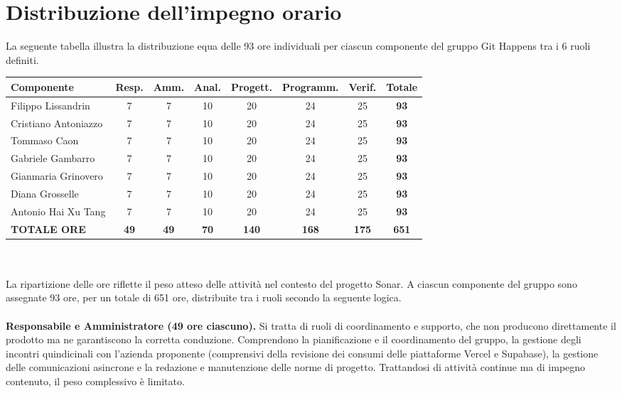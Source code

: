 \section{Distribuzione dell'impegno orario}
La seguente tabella illustra la distribuzione equa delle 93 ore individuali per ciascun componente del gruppo Git Happens tra i 6 ruoli definiti.

\vspace{2mm}
\noindent
\begin{tabularx}{\textwidth}{|X c c c c c c | c|}
\hline
\textbf{Componente} & \textbf{Resp.} & \textbf{Amm.} & \textbf{Anal.} & \textbf{Progett.} & \textbf{Programm.} & \textbf{Verif.} & \textbf{Totale} \\
\hline
Filippo Lissandrin & 7 & 7 & 10 & 20 & 24 & 25 & \textbf{93} \\
Cristiano Antoniazzo & 7 & 7 & 10 & 20 & 24 & 25 & \textbf{93} \\
Tommaso Caon & 7 & 7 & 10 & 20 & 24 & 25 & \textbf{93} \\
Gabriele Gambarro & 7 & 7 & 10 & 20 & 24 & 25 & \textbf{93} \\
Gianmaria Grinovero & 7 & 7 & 10 & 20 & 24 & 25 & \textbf{93} \\
Diana Grosselle & 7 & 7 & 10 & 20 & 24 & 25 & \textbf{93} \\
Antonio Hai Xu Tang & 7 & 7 & 10 & 20 & 24 & 25 & \textbf{93} \\
\hline
\textbf{TOTALE ORE} & \textbf{49} & \textbf{49} & \textbf{70} & \textbf{140} & \textbf{168} & \textbf{175} & \textbf{651} \\
\hline
\end{tabularx}
\\ \\
La ripartizione delle ore riflette il peso atteso delle attività nel contesto del progetto Sonar. A ciascun componente del gruppo sono assegnate 93 ore, per un totale di 651 ore, distribuite tra i ruoli secondo la seguente logica.
\\ \\
\textbf{Responsabile e Amministratore (49 ore ciascuno).} Si tratta di ruoli di coordinamento e supporto, che non producono direttamente il prodotto ma ne garantiscono la corretta conduzione. Comprendono la pianificazione e il coordinamento del gruppo, la gestione degli incontri quindicinali con l'azienda proponente (comprensivi della revisione dei consumi delle piattaforme Vercel e Supabase), la gestione delle comunicazioni asincrone e la redazione e manutenzione delle norme di progetto. Trattandosi di attività continue ma di impegno contenuto, il peso complessivo è limitato.

